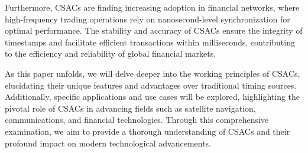 Furthermore, CSACs are finding increasing adoption in financial networks, where high-frequency trading operations rely on nanosecond-level synchronization for optimal performance.
The stability and accuracy of CSACs ensure the integrity of timestamps and facilitate efficient transactions within milliseconds, contributing to the efficiency and reliability of global financial markets.

As this paper unfolds, we will delve deeper into the working principles of CSACs, elucidating their unique features and advantages over traditional timing sources.
Additionally, specific applications and use cases will be explored, highlighting the pivotal role of CSACs in advancing fields such as satellite navigation, communications, and financial technologies.
Through this comprehensive examination, we aim to provide a thorough understanding of CSACs and their profound impact on modern technological advancements.
